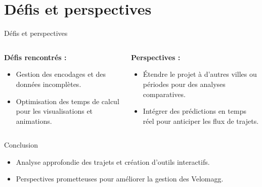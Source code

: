 \documentclass[10pt,svgnames,fragile]{beamer}
\begin{document}
\section{Défis et perspectives}
\label{sec:challenges}
\begin{frame}[label={sec:challengesframe}]{Défis et perspectives}
\begin{columns}
    \begin{column}{0.45\textwidth} %
        \textbf{Défis rencontrés :}
        \begin{itemize}
            \item Gestion des encodages et des données incomplètes.
            \item Optimisation des temps de calcul pour les visualisations et animations.
        \end{itemize}
    \end{column}
    \begin{column}{0.55\textwidth} %
        \textbf{Perspectives :}
        \begin{itemize}
            \item Étendre le projet à d’autres villes ou périodes pour des analyses comparatives.
            \item Intégrer des prédictions en temps réel pour anticiper les flux de trajets.
        \end{itemize}
    \end{column}
\end{columns}
\end{frame}

\begin{frame}[label={sec:conclusion}]{Conclusion}
\begin{itemize}
    \item Analyse approfondie des trajets et création d'outils interactifs.
    \item Perspectives prometteuses pour améliorer la gestion des Velomagg.
\end{itemize}
\end{frame}
\end{document}
